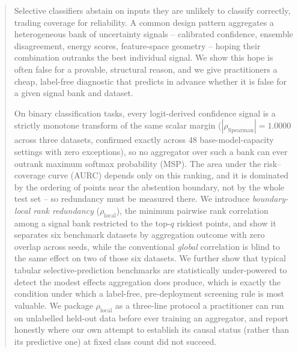 \documentclass[conference]{IEEEtran}
\newcommand{\rholocal}{\rho_{\mathrm{local}}}
\begin{document}
\maketitle

\begin{abstract}
Selective classifiers abstain on inputs they are unlikely to classify correctly, trading coverage for reliability. A common design pattern aggregates a heterogeneous bank of uncertainty signals -- calibrated confidence, ensemble disagreement, energy scores, feature-space geometry -- hoping their combination outranks the best individual signal. We show this hope is often false for a provable, structural reason, and we give practitioners a cheap, label-free diagnostic that predicts in advance whether it is false for a given signal bank and dataset.

On binary classification tasks, every logit-derived confidence signal is a strictly monotone transform of the same scalar margin ($|\rho_{\mathrm{Spearman}}| = 1.0000$ across three datasets, confirmed exactly across 48 base-model-capacity settings with zero exceptions), so no aggregator over such a bank can ever outrank maximum softmax probability (MSP). The area under the risk--coverage curve (AURC) depends only on this ranking, and it is dominated by the ordering of points near the abstention boundary, not by the whole test set -- so redundancy must be measured there. We introduce \emph{boundary-local rank redundancy} ($\rholocal$), the minimum pairwise rank correlation among a signal bank restricted to the top-$q$ riskiest points, and show it separates six benchmark datasets by aggregation outcome with zero overlap across seeds, while the conventional \emph{global} correlation is blind to the same effect on two of those six datasets. We further show that typical tabular selective-prediction benchmarks are statistically under-powered to detect the modest effects aggregation does produce, which is exactly the condition under which a label-free, pre-deployment screening rule is most valuable. We package $\rholocal$ as a three-line protocol a practitioner can run on unlabelled held-out data before ever training an aggregator, and report honestly where our own attempt to establish its causal status (rather than its predictive one) at fixed class count did not succeed.
\end{abstract}
\end{document}
